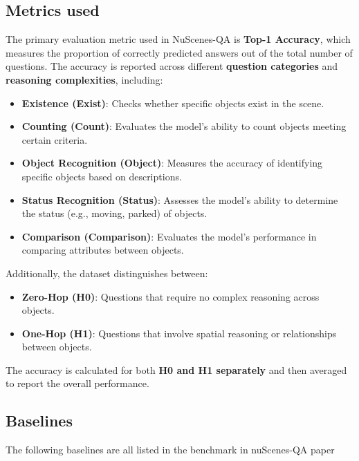 \documentclass{article} %
\begin{document}
	\subsection{  Metrics used}
	The primary evaluation metric used in NuScenes-QA is \textbf{Top-1 Accuracy}, which measures the proportion of correctly predicted answers out of the total number of questions. The accuracy is reported across different \textbf{question categories} and \textbf{reasoning complexities}, including:
	\begin{itemize}
		\item \textbf{Existence (Exist)}: Checks whether specific objects exist in the scene.
		\item \textbf{Counting (Count)}: Evaluates the model's ability to count objects meeting certain criteria.
		\item \textbf{Object Recognition (Object)}: Measures the accuracy of identifying specific objects based on descriptions.
		\item \textbf{Status Recognition (Status)}: Assesses the model's ability to determine the status (e.g., moving, parked) of objects.
		\item \textbf{Comparison (Comparison)}: Evaluates the model’s performance in comparing attributes between objects.
	\end{itemize}
	
	Additionally, the dataset distinguishes between:
	\begin{itemize}
		\item \textbf{Zero-Hop (H0)}: Questions that require no complex reasoning across objects.
		\item \textbf{One-Hop (H1)}: Questions that involve spatial reasoning or relationships between objects.
	\end{itemize}
	
	The accuracy is calculated for both \textbf{H0 and H1 separately} and then averaged to report the overall performance.
	
	
	\subsection{ Baselines} 
	
	The following baselines are all listed in the benchmark in nuScenes-QA paper \cite{qian2024nuscenes}
	
\end{document}
